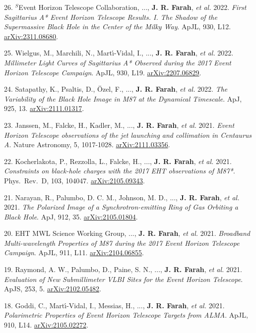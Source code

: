 \documentclass[margin,line]{res}
\newcommand{\apj}{ApJ}                    %
\newcommand{\apjl}{ApJL}                  %
\newcommand{\apjs}{ApJS}                  %
\newcommand{\prd}{Phys.~Rev.~D}           %
\begin{document}
\begin{resume}
\begin{mdframed}[linecolor=red]
26. $^S$Event Horizon Telescope Collaboration, ..., \textbf{J. R. Farah}, \textit{et al.} 2022. \textit{First Sagittarius A* Event Horizon Telescope Results. I. The Shadow of the Supermassive Black Hole in the Center of the Milky Way}. \apjl, 930, L12. \href{https://arxiv.org/abs/2311.08680}{arXiv:2311.08680}.

\end{mdframed}

25. Wielgus, M., Marchili, N., Mart{\'\i}-Vidal, I., ..., \textbf{J. R. Farah}, \textit{et al.} 2022. \textit{Millimeter Light Curves of Sagittarius A* Observed during the 2017 Event Horizon Telescope Campaign}. \apjl, 930, L19. \href{https://arxiv.org/abs/2207.06829}{arXiv:2207.06829}.

24. Satapathy, K., Psaltis, D., {\"O}zel, F., ..., \textbf{J. R. Farah}, \textit{et al.} 2022. \textit{The Variability of the Black Hole Image in M87 at the Dynamical Timescale}. \apj, 925, 13. \href{https://arxiv.org/abs/2111.01317}{arXiv:2111.01317}.

23. Janssen, M., Falcke, H., Kadler, M., ..., \textbf{J. R. Farah}, \textit{et al.} 2021. \textit{Event Horizon Telescope observations of the jet launching and collimation in Centaurus A}. Nature Astronomy, 5, 1017-1028. \href{https://arxiv.org/abs/2111.03356}{arXiv:2111.03356}.

22. Kocherlakota, P., Rezzolla, L., Falcke, H., ..., \textbf{J. R. Farah}, \textit{et al.} 2021. \textit{Constraints on black-hole charges with the 2017 EHT observations of M87*}. \prd, 103, 104047. \href{https://arxiv.org/abs/2105.09343}{arXiv:2105.09343}.

21. Narayan, R., Palumbo, D. C. M., Johnson, M. D., ..., \textbf{J. R. Farah}, \textit{et al.} 2021. \textit{The Polarized Image of a Synchrotron-emitting Ring of Gas Orbiting a Black Hole}. \apj, 912, 35. \href{https://arxiv.org/abs/2105.01804}{arXiv:2105.01804}.

20. EHT MWL Science Working Group, ..., \textbf{J. R. Farah}, \textit{et al.} 2021. \textit{Broadband Multi-wavelength Properties of M87 during the 2017 Event Horizon Telescope Campaign}. \apjl, 911, L11. \href{https://arxiv.org/abs/2104.06855}{arXiv:2104.06855}.

19. Raymond, A. W., Palumbo, D., Paine, S. N., ..., \textbf{J. R. Farah}, \textit{et al.} 2021. \textit{Evaluation of New Submillimeter VLBI Sites for the Event Horizon Telescope}. \apjs, 253, 5. \href{https://arxiv.org/abs/2102.05482}{arXiv:2102.05482}.

18. Goddi, C., Mart{\'\i}-Vidal, I., Messias, H., ..., \textbf{J. R. Farah}, \textit{et al.} 2021. \textit{Polarimetric Properties of Event Horizon Telescope Targets from ALMA}. \apjl, 910, L14. \href{https://arxiv.org/abs/2105.02272}{arXiv:2105.02272}.


\end{resume}
\end{document}
